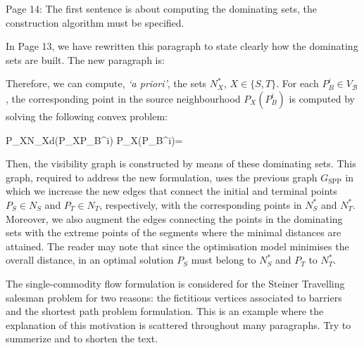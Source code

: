 \documentclass{article}
\newenvironment{reviewer}{\setcounter{pointcounter}{1}}{}
\newcommand{\point}{\text{{\selectfont \thepointcounter} \stepcounter{pointcounter}}}
\begin{document}
\begin{reviewer}
		\begin{itshape}
			Page 14: The first sentence is about computing the dominating sets, the construction algorithm must be specified.
		\end{itshape}
		
		\begin{tcolorbox}[breakable,enhanced,coltitle=black,colback=red!5!white,colframe=red!75!black,title=\textbf{Answer R1.\point},borderline={1pt}{0pt}{black},boxrule=0pt]
		In Page 13, we have rewritten this paragraph to state clearly how the dominating sets are built. The new paragraph is:
		
		\medskip
		
		Therefore, we can compute, \textit{`a priori'},  the sets $N_X^*$, $X\in\{S,T\}$. For each $P_B^i\in V_{\mathcal B}$, the corresponding point in the source neighbourhood $P_X(P_B^i)$ is computed by solving the following convex problem:
		\begin{argmini*}
			{P_X\in N_X}{d(P_XP_B^i)}
			{}{P_X(P_B^i)=}\label{eq:computing_n}
		\end{argmini*}
		
		Then, the visibility graph is constructed by means of these dominating sets.
		This graph, required to address the new formulation, uses the previous graph $G_{\text{SPP}}$ in which we increase the new edges that connect the initial and terminal points $P_S\in N_S$ and $P_T\in N_T$, respectively, with the corresponding points in $N_S^*$ and $N_T^*$. Moreover, we also augment the edges connecting the points in the dominating sets with the extreme points of the segments where the minimal distances are attained. The reader may note that since the optimisation model minimises the overall distance, in an optimal solution $P_S$ must belong to $N_S^*$ and $P_T$ to $N_T^*$.
			

		\end{tcolorbox}
		
		\begin{itshape}
			The single-commodity flow formulation is considered for the Steiner Travelling salesman
			problem for two reasons: the fictitious vertices associated to barriers and the shortest path
			problem formulation. This is an example where the explanation of this motivation is scattered
			throughout many paragraphs. Try to summerize and to shorten the text.
		\end{itshape}
		

\end{reviewer}
\end{document}
